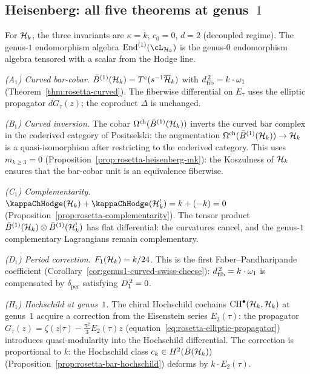 \subsection{Heisenberg: all five theorems at genus~$1$}%
\label{subsec:heisenberg-genus1-endomorphism}

\begin{computation}%
\label{comp:heisenberg-genus1-endomorphism}%
%
For $\mathcal{H}_k$, the three invariants are
$\kappa = k$, $c_0 = 0$, $d = 2$
\textup{(}decoupled regime\textup{)}.
The genus-$1$ endomorphism algebra
$\End^{(1)}(\cL_{\cH_k})$ is the genus-$0$
endomorphism algebra tensored with a scalar from
the Hodge line.

\smallskip
\noindent
\emph{(A$_1$) Curved bar-cobar.}
$\bar{B}^{(1)}(\mathcal{H}_k) = T^c(s^{-1}\overline{\mathcal{H}}_k)$
with $d_{\mathrm{fib}}^{\,2} = k \cdot \omega_1$
(Theorem~\ref{thm:rosetta-curved}).
The fiberwise differential on $E_\tau$ uses the
elliptic propagator $dG_\tau(z)$; the coproduct
$\Delta$ is unchanged.

\smallskip
\noindent
\emph{(B$_1$) Curved inversion.}
The cobar $\Omega^{\mathrm{ch}}(\bar{B}^{(1)}(\mathcal{H}_k))$ inverts the
curved bar complex in the coderived category of
Positselski: the augmentation
$\Omega^{\mathrm{ch}}(\bar{B}^{(1)}(\mathcal{H}_k)) \to \mathcal{H}_k$ is a
quasi-isomorphism after restricting to the coderived
category. This uses $m_{k \ge 3} = 0$
(Proposition~\ref{prop:rosetta-heisenberg-mk}): the
Koszulness of $\mathcal{H}_k$ ensures that the bar-cobar
unit is an equivalence fiberwise.

\smallskip
\noindent
\emph{(C$_1$) Complementarity.}
$\kappaChHodge(\cH_k) + \kappaChHodge(\cH_k^!) = k + (-k) = 0$
(Proposition~\ref{prop:rosetta-complementarity}).
The tensor product
$\bar{B}^{(1)}(\mathcal{H}_k) \otimes \bar{B}^{(1)}(\mathcal{H}_k^!)$
has flat differential: the curvatures cancel, and the
genus-$1$ complementary Lagrangians remain
complementary.

\smallskip
\noindent
\emph{(D$_1$) Period correction.}
$F_1(\mathcal{H}_k) = k/24$. This is the first
Faber--Pandharipande coefficient
(Corollary~\ref{cor:genus1-curved-swiss-cheese}):
$d_{\mathrm{fib}}^{\,2} = k \cdot \omega_1$ is compensated by
$\delta_{\mathrm{per}}$ satisfying
$D_{1}^{\,2} = 0$.

\smallskip
\noindent
\emph{(H$_1$) Hochschild at genus~$1$.}
The chiral Hochschild cochains
$\mathrm{CH}^\bullet(\mathcal{H}_k, \mathcal{H}_k)$
at genus~$1$ acquire a correction from the Eisenstein
series $E_2(\tau)$: the propagator
$G_\tau(z) = \zeta(z|\tau) - \frac{\pi^2}{3}E_2(\tau) z$
(equation~\eqref{eq:rosetta-elliptic-propagator})
introduces quasi-modularity into the Hochschild
differential. The correction is proportional to $k$:
the Hochschild class $c_k \in H^2(\bar{B}(\mathcal{H}_k))$
(Proposition~\ref{prop:rosetta-bar-hochschild})
deforms by $k \cdot E_2(\tau)$.


\end{computation}
